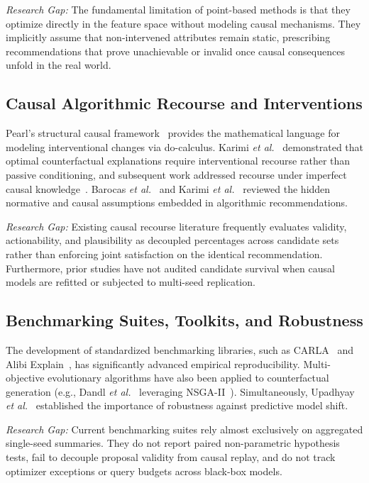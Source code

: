 \documentclass[nolineno]{paper/ieee-access/ieeeaccess}%
\begin{document}
\emph{Research Gap:} The fundamental limitation of point-based methods is that they optimize directly in the feature space without modeling causal mechanisms. They implicitly assume that non-intervened attributes remain static, prescribing recommendations that prove unachievable or invalid once causal consequences unfold in the real world.

\subsection{Causal Algorithmic Recourse and Interventions}
Pearl's structural causal framework~\cite{pearl2009causality} provides the mathematical language for modeling interventional changes via do-calculus. Karimi \emph{et al.}~\cite{karimi2021recourse} demonstrated that optimal counterfactual explanations require interventional recourse rather than passive conditioning, and subsequent work addressed recourse under imperfect causal knowledge~\cite{karimi2020imperfect}. Barocas \emph{et al.}~\cite{barocas2020hidden} and Karimi \emph{et al.}~\cite{karimi2022survey} reviewed the hidden normative and causal assumptions embedded in algorithmic recommendations.

\emph{Research Gap:} Existing causal recourse literature frequently evaluates validity, actionability, and plausibility as decoupled percentages across candidate sets rather than enforcing joint satisfaction on the identical recommendation. Furthermore, prior studies have not audited candidate survival when causal models are refitted or subjected to multi-seed replication.

\subsection{Benchmarking Suites, Toolkits, and Robustness}
The development of standardized benchmarking libraries, such as CARLA~\cite{pawelczyk2021carla} and Alibi Explain~\cite{klaise2021alibi}, has significantly advanced empirical reproducibility. Multi-objective evolutionary algorithms have also been applied to counterfactual generation (e.g., Dandl \emph{et al.}~\cite{dandl2020multi} leveraging NSGA-II~\cite{deb2002nsga}). Simultaneously, Upadhyay \emph{et al.}~\cite{upadhyay2021robust} established the importance of robustness against predictive model shift.

\emph{Research Gap:} Current benchmarking suites rely almost exclusively on aggregated single-seed summaries. They do not report paired non-parametric hypothesis tests, fail to decouple proposal validity from causal replay, and do not track optimizer exceptions or query budgets across black-box models.
\end{document}
